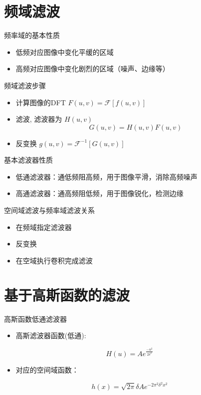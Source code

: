 \documentclass[presentation]{beamer}
\begin{document}
\section{频域滤波}
\label{sec:org203ec77}
\begin{frame}[label={sec:org170b5f6}]{频率域的基本性质}
\begin{itemize}
\item 低频对应图像中变化平缓的区域
\item 高频对应图像中变化剧烈的区域（噪声、边缘等）
\end{itemize}
\end{frame}
\begin{frame}[label={sec:org598840b}]{频域滤波步骤}
\begin{itemize}
\item 计算图像的DFT \(F(u,v)=\mathcal{F}[f(u,v)]\)
\item 滤波, 滤波器为 \(H(u,v)\)
\[G(u,v) = H(u,v) F(u,v)\]
\item 反变换  \(g(u,v)=\mathcal{F}^{-1}[G(u,v)]\)
\end{itemize}
\end{frame}
\begin{frame}[label={sec:org435276d}]{基本滤波器性质}
\begin{itemize}
\item 低通滤波器：通低频阻高频，用于图像平滑，消除高频噪声
\item 高通滤波器：通高频阻低频，用于图像锐化，检测边缘
\end{itemize}
\end{frame}
\begin{frame}[label={sec:org3e0886c}]{空间域滤波与频率域滤波关系}
\begin{itemize}
\item 在频域指定滤波器
\item 反变换
\item 在空域执行卷积完成滤波
\end{itemize}
\end{frame}

\section{基于高斯函数的滤波}
\label{sec:org24ff7aa}
\begin{frame}[label={sec:orgd3639c8}]{高斯函数低通滤波器}
\begin{itemize}
\item 高斯滤波器函数(低通):
\end{itemize}
\[ H(u)=Ae^{\frac{-u^2}{2\delta^2}} \]
\begin{itemize}
\item 对应的空间域函数：
\end{itemize}
\[ h(x)=\sqrt{2\pi}\delta Ae^{-2\pi^2\delta^2 x^2}\]
\end{frame}
\end{document}
